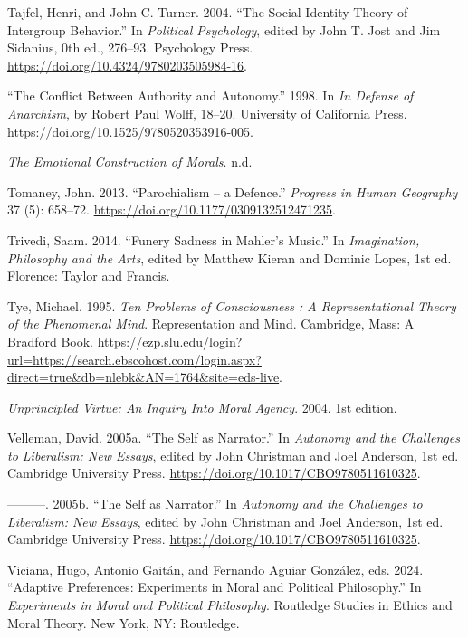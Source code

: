 \documentclass[12pt]{book}
\newenvironment{CSLReferences}%
  {\setlength{\parindent}{0pt}%
   \setlength{\leftskip}{0pt}%
   \setlength{\parskip}{0pt}}%
  {\par}
\theoremstyle{definition}
\theoremstyle{remark}
\begin{document}
\begin{CSLReferences}{1}{0}
Tajfel, Henri, and John C. Turner. 2004. {``The {Social Identity Theory} of {Intergroup Behavior}.''} In \emph{Political {Psychology}}, edited by John T. Jost and Jim Sidanius, 0th ed., 276--93. Psychology Press. \url{https://doi.org/10.4324/9780203505984-16}.

{``The {Conflict Between Authority} and {Autonomy}.''} 1998. In \emph{In {Defense} of {Anarchism}}, by Robert Paul Wolff, 18--20. University of California Press. \url{https://doi.org/10.1525/9780520353916-005}.

\emph{The {Emotional Construction} of {Morals}}. n.d.

Tomaney, John. 2013. {``Parochialism -- a Defence.''} \emph{Progress in Human Geography} 37 (5): 658--72. \url{https://doi.org/10.1177/0309132512471235}.

Trivedi, Saam. 2014. {``Funery {Sadness} in {Mahler}'s {Music}.''} In \emph{Imagination, {Philosophy} and the {Arts}}, edited by Matthew Kieran and Dominic Lopes, 1st ed. Florence: {Taylor and Francis}.

Tye, Michael. 1995. \emph{Ten {Problems} of {Consciousness} : {A Representational Theory} of the {Phenomenal Mind}}. Representation and {Mind}. Cambridge, Mass: A Bradford Book. \url{https://ezp.slu.edu/login?url=https://search.ebscohost.com/login.aspx?direct=true&db=nlebk&AN=1764&site=eds-live}.

\emph{Unprincipled {Virtue}: {An Inquiry Into Moral Agency}}. 2004. 1st edition.

Velleman, David. 2005a. {``The {Self} as {Narrator}.''} In \emph{Autonomy and the {Challenges} to {Liberalism}: {New Essays}}, edited by John Christman and Joel Anderson, 1st ed. Cambridge University Press. \url{https://doi.org/10.1017/CBO9780511610325}.

---------. 2005b. {``The {Self} as {Narrator}.''} In \emph{Autonomy and the {Challenges} to {Liberalism}: {New Essays}}, edited by John Christman and Joel Anderson, 1st ed. Cambridge University Press. \url{https://doi.org/10.1017/CBO9780511610325}.

Viciana, Hugo, Antonio Gaitán, and Fernando Aguiar González, eds. 2024. {``Adaptive {Preferences}: {Experiments} in {Moral} and {Political Philosophy}.''} In \emph{Experiments in Moral and Political Philosophy}. Routledge Studies in Ethics and Moral Theory. New York, NY: Routledge.


\end{CSLReferences}
\end{document}
